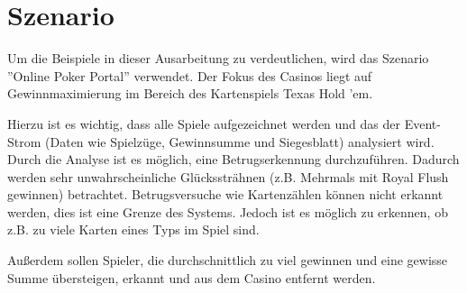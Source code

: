 \chapter{Szenario}
\label{Szenario}
Um die Beispiele in dieser Ausarbeitung zu verdeutlichen, wird das Szenario ''Online Poker Portal'' verwendet. Der Fokus des Casinos liegt auf Gewinnmaximierung im Bereich des Kartenspiels Texas Hold 'em.

Hierzu ist es wichtig, dass alle Spiele aufgezeichnet werden und das der Event-Strom (Daten wie Spielzüge, Gewinnsumme und Siegesblatt) analysiert wird. 
Durch die Analyse ist es möglich, eine Betrugserkennung durchzuführen. Dadurch werden sehr unwahrscheinliche Glückssträhnen (z.B. Mehrmals mit Royal Flush gewinnen) betrachtet.
Betrugsversuche wie Kartenzählen können nicht erkannt werden, dies ist eine Grenze des Systems. Jedoch ist es möglich zu erkennen, ob z.B. zu viele Karten eines Typs im Spiel sind.

Außerdem sollen Spieler, die durchschnittlich zu viel gewinnen und eine gewisse Summe übersteigen, erkannt und aus dem Casino entfernt werden.